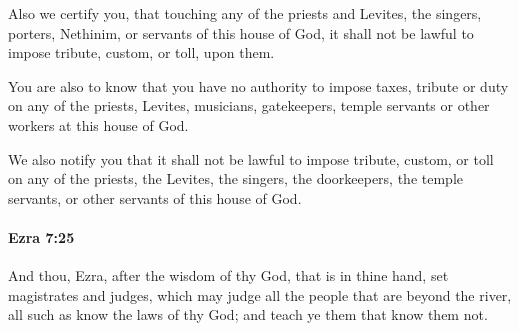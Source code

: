 			\begin{versebox}
					\item[BHS] 
					\item[LXX] 
					\item[ASV] Also we certify you, that touching any of the priests and Levites, the singers, porters, Nethinim, or servants of this house of God, it shall not be lawful to impose tribute, custom, or toll, upon them.
					\item[NIV] You are also to know that you have no authority to impose taxes, tribute or duty on any of the priests, Levites, musicians, gatekeepers, temple servants or other workers at this house of God.
					\item[NRSV] We also notify you that it shall not be lawful to impose tribute, custom, or toll on any of the priests, the Levites, the singers, the doorkeepers, the temple servants, or other servants of this house of God.
			\end{versebox}

		\paragraph{Ezra 7:25} %
			\label{EZRA-7-25}

			And thou, Ezra, after the wisdom of thy God, that is in thine hand, set magistrates and judges, which may judge all the people that are beyond the river, all such as know the laws of thy God; and teach ye them that know them not.

